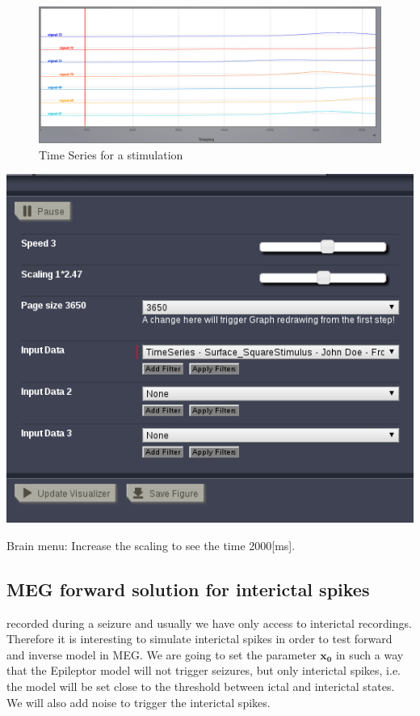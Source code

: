 \documentclass{tufte-handout}
\begin{document}
\begin{figure}[h]
  \includegraphics[width=\linewidth]{Handout_UI_ModellingAnEpilepticPatient_StimulationTimeSeries}%
  \caption{Time Series for a stimulation}%
  \label{fig:stim_ts}%
\end{figure}

\begin{marginfigure}
  \includegraphics[width=\linewidth]{Handout_UI_ModellingAnEpilepticPatient_BrainMenuStimulation}%
  \caption{Brain menu: Increase the scaling to see the time \unit{2000}[ms].}%
  \label{fig:bm_stim}%
\end{marginfigure}

\subsection{MEG forward solution for interictal spikes}

 recorded during a seizure and usually we have only access to interictal recordings.
Therefore it is interesting to simulate interictal spikes in order to test forward and inverse model in MEG.
We are going to set the parameter $\mathbf{x_0}$ in such a way that the Epileptor model will not trigger seizures, but only interictal spikes, 
i.e. the model will be set close to the threshold between ictal and interictal states. 
We will also add noise to trigger the interictal spikes.
\end{document}
